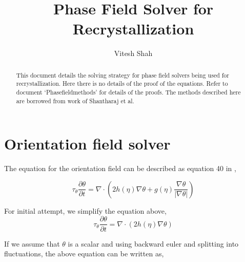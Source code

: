 \documentclass[a4paper,11pt,dvipsnames]{article}
\title{\textbf{Phase Field Solver for Recrystallization}}
\author{Vitesh Shah}
\begin{document}
\nonstopmode
\begin{titlingpage}
	\maketitle
	\begin{abstract}
	This document details the solving strategy for phase field solvers being used for recrystallization. 
    Here there is no details of the proof of the equations. 
    Refer to document `Phase\textunderscore field\textunderscore methods' for details of the proofs. 
    The methods described here are borrowed from work of Shantharaj et al. 
	\end{abstract}
\end{titlingpage}

\newcommand\mathsym[1]{\begin{math} {#1} \end{math}}
\newcommand{\Tau}{\mathrm{T}}

\section{Orientation field solver}
The equation for the orientation field can be described as equation 40 in \cite{Abrivard2012b},

\begin{equation}
    \tau_\theta \frac{\partial \theta}{\partial t} = \nabla \cdot \left ( 2h(\eta) \nabla \theta + g(\eta) \frac{\nabla \theta}{\left | \nabla \theta \right |} \right ) \label{eq:1} 
\end{equation}

For initial attempt, we simplify the equation above,
\begin{equation}
    \tau_\theta \frac{\partial \theta}{\partial t} = \nabla \cdot \left ( 2h(\eta) \nabla \theta \right ) \label{eq:2} 
\end{equation}

If we assume that \mathsym{\theta} is a scalar and 
using backward euler and splitting into fluctuations, the above equation can be written as, 
\end{document}
